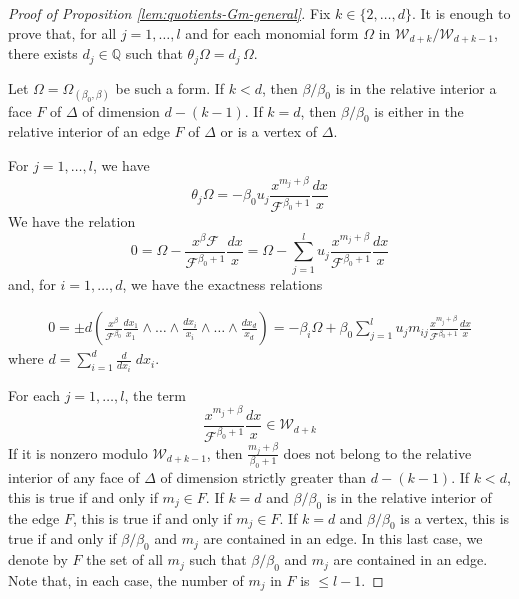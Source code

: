 \documentclass[11pt, reqno]{amsart}
\theoremstyle{plain}
\theoremstyle{definition}
\begin{document}
\begin{proof}[Proof of Proposition \ref{lem:quotients-Gm-general}]
Fix $k \in \{2,\dots, d\}$. It is enough to prove that, for all $j=1, \dots, l$ and for each monomial form $\Omega$ in $\mathscr{W}_{d+k}/\mathscr{W}_{d+k-1}$, there exists $d_j\in \mathbb{Q}$ such that $\theta_j  \Omega=d_j \,  \Omega$. 

Let $\Omega=\Omega_{(\beta_0, \beta)}$ be such a form. 
If $k<d$, then $\beta/\beta_0$ is in the relative interior a face $F$ of $\Delta$ of dimension $d-(k-1)$. If $k=d$, then $\beta/\beta_0$ is either in the relative interior of an edge $F$ of $\Delta$ or is a vertex of $\Delta$. 

For $j=1, \dots, l$, we have 
\begin{equation}
\label{eq:thetaj-omega} 
    \theta_j \Omega = 
    -\beta_0 u_j \frac{x^{m_{j}+\beta}}{\mathcal{F}^{\beta_0+1}} \frac{dx}{x}
    \end{equation}
We have the relation
\begin{equation}
\label{eq:exact-relation-zero}
0= \Omega -\frac{x^\beta \mathcal{F} }{{\mathcal{F}}^{\beta_0+1}}\frac{dx}{x} =
\Omega-\sum_{j=1}^l u_j \frac{x^{m_{j}+\beta} }{{\mathcal{F}}^{\beta_0+1}}\frac{dx}{x} 
\end{equation}   
and, for $i=1,\dots,d$, we have the exactness relations

\begin{equation}
\label{eq:exact-relations}
\begin{split}
    0 = \pm d \left(\frac{x^{\beta}}{\mathcal{F}^{\beta_0}} \frac{dx_1}{x_1} \wedge \dots \wedge \widehat{\frac{dx_i}{x_i}} \wedge \dots \wedge \frac{dx_{d}}{x_d}\right)
    = -\beta_i \Omega + \beta_0 \sum_{j=1}^l u_j m_{ij}\frac{x^{m_{j}+\beta}}{\mathcal{F}^{\beta_0+1}}\frac{dx}{x} 
\end{split} 
\end{equation}
where $d=\sum_{i=1}^d \frac{d}{dx_i} \; dx_i$.

For each $j=1, \dots, l$,
the term 
\[
\frac{x^{m_{j}+\beta} }{{\mathcal{F}}^{\beta_0+1}}\frac{dx}{x}  \in \mathscr{W}_{d+k} 
\]
If it is nonzero modulo $\mathscr{W}_{d+k-1}$, then $\frac{m_{j}+\beta}{\beta_0+1}$  does not belong to the relative interior of any face of $\Delta$ of dimension strictly greater than $d-(k-1)$. 
If $k<d$, this is true if and only if $m_j \in F$.  
If $k=d$ and $\beta/\beta_0$ is in the relative interior of the edge $F$, this is true if and only if $m_j \in F$. If $k=d$ and $\beta/\beta_0$ is a vertex, this is true if and only if $\beta/\beta_0$ and $m_j$ are contained in an edge. In this last case, we denote by $F$ the set of all $m_j$ such that $\beta/\beta_0$ and $m_j$ are contained in an edge.  Note that, in each case, the number of $m_j$ in $F$ is $\leq l-1$.


\end{proof}
\end{document}
